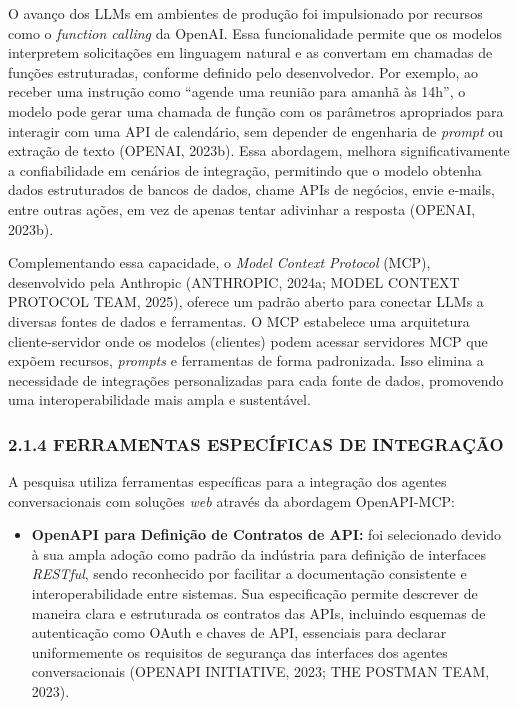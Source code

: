 \documentclass[
]{article}
\providecommand{\tightlist}{%
  \setlength{\itemsep}{0pt}\setlength{\parskip}{0pt}}
\begin{document}
O avanço dos LLMs em ambientes de produção foi impulsionado por recursos
como o \emph{function calling} da OpenAI. Essa funcionalidade permite
que os modelos interpretem solicitações em linguagem natural e as
convertam em chamadas de funções estruturadas, conforme definido pelo
desenvolvedor. Por exemplo, ao receber uma instrução como ``agende uma
reunião para amanhã às 14h'', o modelo pode gerar uma chamada de função
com os parâmetros apropriados para interagir com uma API de calendário,
sem depender de engenharia de \emph{prompt} ou extração de texto
(OPENAI, 2023b). Essa abordagem, melhora significativamente a
confiabilidade em cenários de integração, permitindo que o modelo
obtenha dados estruturados de bancos de dados, chame APIs de negócios,
envie e-mails, entre outras ações, em vez de apenas tentar adivinhar a
resposta (OPENAI, 2023b).

Complementando essa capacidade, o \emph{Model Context Protocol} (MCP),
desenvolvido pela Anthropic (ANTHROPIC, 2024a; MODEL CONTEXT PROTOCOL
TEAM, 2025), oferece um padrão aberto para conectar LLMs a diversas
fontes de dados e ferramentas. O MCP estabelece uma arquitetura
cliente-servidor onde os modelos (clientes) podem acessar servidores MCP
que expõem recursos, \emph{prompts} e ferramentas de forma padronizada.
Isso elimina a necessidade de integrações personalizadas para cada fonte
de dados, promovendo uma interoperabilidade mais ampla e sustentável.

\subsubsection{2.1.4 FERRAMENTAS ESPECÍFICAS DE
INTEGRAÇÃO}\label{ferramentas-especuxedficas-de-integrauxe7uxe3o}

A pesquisa utiliza ferramentas específicas para a integração dos agentes
conversacionais com soluções \emph{web} através da abordagem
OpenAPI-MCP:

\begin{itemize}
\tightlist
\item
  \textbf{OpenAPI para Definição de Contratos de API:} foi selecionado
  devido à sua ampla adoção como padrão da indústria para definição de
  interfaces \emph{RESTful}, sendo reconhecido por facilitar a
  documentação consistente e interoperabilidade entre sistemas. Sua
  especificação permite descrever de maneira clara e estruturada os
  contratos das APIs, incluindo esquemas de autenticação como OAuth e
  chaves de API, essenciais para declarar uniformemente os requisitos de
  segurança das interfaces dos agentes conversacionais (OPENAPI
  INITIATIVE, 2023; THE POSTMAN TEAM, 2023).
\end{itemize}
\end{document}
